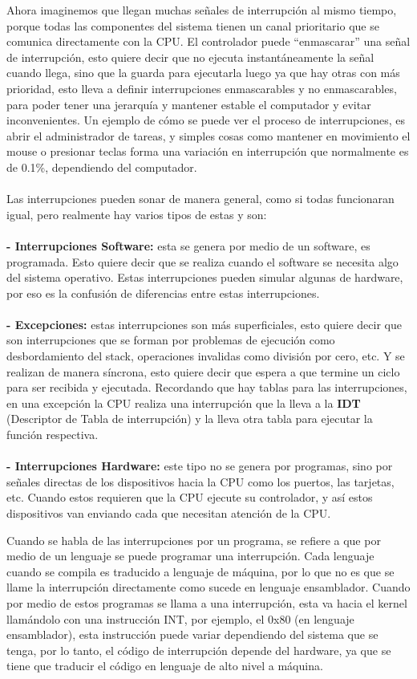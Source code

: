 \documentclass{letter}
\begin{document}
Ahora imaginemos que llegan muchas señales de interrupción al mismo tiempo, porque todas las componentes del sistema tienen un canal prioritario que se comunica directamente con la CPU. El controlador puede “enmascarar” una señal de interrupción, esto quiere decir que no ejecuta instantáneamente la señal cuando llega, sino que la guarda para ejecutarla luego ya que hay otras con más prioridad, esto lleva a definir interrupciones enmascarables y no enmascarables, para poder tener una jerarquía y mantener estable el computador y evitar inconvenientes. Un ejemplo de cómo se puede ver el proceso de interrupciones, es abrir el administrador de tareas, y simples cosas como mantener en movimiento el mouse o presionar teclas forma una variación en interrupción que normalmente es de 0.1\%, dependiendo del computador.\\\\
 Las interrupciones pueden sonar de manera general, como si todas funcionaran igual, pero realmente hay varios tipos de estas y son:\\\\
\textbf{- Interrupciones Software:} esta se genera por medio de un software, es programada. Esto quiere decir que se realiza cuando el software se necesita algo del sistema operativo. Estas interrupciones pueden simular algunas de hardware, por eso es la confusión de diferencias entre estas interrupciones.\\\\
\textbf{- Excepciones:} estas interrupciones son más superficiales, esto quiere decir que son interrupciones que se forman por problemas de ejecución como desbordamiento del stack, operaciones invalidas como división por cero, etc. Y se realizan de manera síncrona, esto quiere decir que espera a que termine un ciclo para ser recibida y ejecutada. Recordando que hay tablas para las interrupciones, en una excepción la CPU realiza una interrupción que la lleva a la \textbf{IDT} (Descriptor de Tabla de interrupción) y la lleva otra tabla para ejecutar la función respectiva.\\\\
\textbf{- Interrupciones Hardware:}  este tipo no se genera por programas, sino por señales directas de los dispositivos hacia la CPU como los puertos, las tarjetas, etc. Cuando estos requieren que la CPU ejecute su controlador, y así estos dispositivos van enviando cada que necesitan atención de la CPU.

Cuando se habla de las interrupciones por un programa, se refiere a que por medio de un lenguaje se puede programar una interrupción. Cada lenguaje cuando se compila es traducido a lenguaje de máquina, por lo que no es que se llame la interrupción directamente como sucede en lenguaje ensamblador. Cuando por medio de estos programas se llama a una interrupción, esta va hacia el kernel llamándolo con una instrucción INT, por ejemplo, el 0x80 (en lenguaje ensamblador), esta instrucción puede variar dependiendo del sistema que se tenga, por lo tanto, el código de interrupción depende del hardware, ya que se tiene que traducir el código en lenguaje de alto nivel a máquina. 
\end{document}
